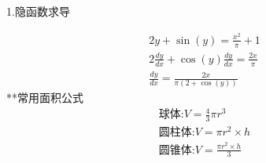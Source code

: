 \documentclass[UTF8,fontset=ubuntu]{ctexart}
\begin{document}
	1.隐函数求导\par
	\begin{align}
		2y+\sin(y)=\frac{x^2}{\pi}+1\\
		2\frac{dy}{dx}+\cos(y)\frac{dy}{dx}=\frac{2x}{\pi}\\
		\frac{dy}{dx}=\frac{2x}{\pi(2+\cos(y))}
	\end{align}
	**常用面积公式
	\begin{align}
		\text{球体:}V=\frac{4}{3}\pi r^3\\
		\text{圆柱体:}V=\pi r^2\times h\\
		\text{圆锥体:}V=\frac{\pi r^2\times h}{3}
	\end{align}
\end{document}
